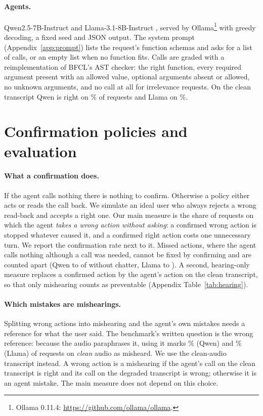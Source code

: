 \documentclass[11pt]{article}
\begin{document}
\paragraph{Agents.} Qwen2.5-7B-Instruct \citep{qwen2024qwen25} and Llama-3.1-8B-Instruct \citep{grattafiori2024llama3}, served by Ollama\footnote{Ollama 0.11.4: \url{https://github.com/ollama/ollama}.} with greedy decoding, a fixed seed and JSON output. The system prompt (Appendix~\ref{app:prompt}) lists the request's function schemas and asks for a list of calls, or an empty list when no function fits. Calls are graded with a reimplementation of BFCL's AST checker: the right function, every required argument present with an allowed value, optional arguments absent or allowed, no unknown arguments, and no call at all for irrelevance requests. On the clean transcript Qwen is right on \QwenAccSaid\% of requests and Llama on \LlamaAccSaid\%.

\section{Confirmation policies and evaluation}

\paragraph{What a confirmation does.} If the agent calls nothing there is nothing to confirm. Otherwise a policy either acts or reads the call back. We simulate an ideal user who always rejects a wrong read-back and accepts a right one. Our main measure is the share of requests on which the agent \emph{takes a wrong action without asking}: a confirmed wrong action is stopped whatever caused it, and a confirmed right action costs one unnecessary turn. We report the confirmation rate next to it. Missed actions, where the agent calls nothing although a call was needed, cannot be fixed by confirming and are counted apart (Qwen \QwenMissedMin{} to \QwenMissedMax{} of \NItems{} without chatter, Llama \LlamaMissedMin{} to \LlamaMissedMax). A second, hearing-only measure replaces a confirmed action by the agent's action on the clean transcript, so that only mishearing counts as preventable (Appendix Table~\ref{tab:hearing}).

\paragraph{Which mistakes are mishearings.} Splitting wrong actions into mishearing and the agent's own mistakes needs a reference for what the user said. The benchmark's written question is the wrong reference: because the audio paraphrases it, using it marks \QwenQuestionMisheard\% (Qwen) and \LlamaQuestionMisheard\% (Llama) of requests on \emph{clean} audio as misheard. We use the clean-audio transcript instead. A wrong action is a mishearing if the agent's call on the clean transcript is right and its call on the degraded transcript is wrong; otherwise it is an agent mistake. The main measure does not depend on this choice.
\end{document}
